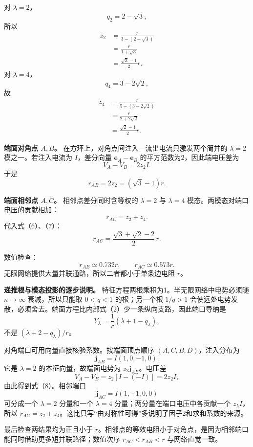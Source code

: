 \documentclass[12pt,a4paper,UTF8]{ctexart}
\begin{document}
对 \(\lambda=2\)， \[
q_2=2-\sqrt3,
\] 所以 \[
\begin{aligned}
z_2
&=\frac r{3-(2-\sqrt3)}\\
&=\frac r{1+\sqrt3}\\
&=\frac{\sqrt3-1}{2}r.
\end{aligned} \tag{6}
\] 对 \(\lambda=4\)， \[
q_4=3-2\sqrt2,
\] 故 \[
\begin{aligned}
z_4
&=\frac r{5-(3-2\sqrt2)}\\
&=\frac r{2+2\sqrt2}\\
&=\frac{\sqrt2-1}{2}r.
\end{aligned} \tag{7}
\]

\textbf{端面对角点 \(A,B\)。}
在方环上，对角点间注入---流出电流只激发两个简并的 \(\lambda=2\)
模之一。若注入电流为 \(I\)，差分向量 \(\boldsymbol e_A-\boldsymbol e_B\)
的平方范数为2，因此端电压差为 \[
V_A-V_B=2z_2I.
\] 于是 \[
\boxed{
r_{AB}=2z_2=(\sqrt3-1)r
}. \tag{8}
\]

\textbf{端面相邻点 \(A,C\)。} 相邻点差分同时含等权的 \(\lambda=2\) 与
\(\lambda=4\) 模态。两模态对端口电压的贡献相加： \[
r_{AC}=z_2+z_4.
\] 代入式（6）、（7）： \[
\boxed{
r_{AC}
=\frac{\sqrt3+\sqrt2-2}{2}\,r
}. \tag{9}
\]

数值检查： \[
r_{AB}\simeq0.732r,\qquad
r_{AC}\simeq0.573r.
\] 无限网络提供大量并联通路，所以二者都小于单条边电阻 \(r\)。

\textbf{递推根与模态投影的逐步说明。}
特征方程两根乘积为1。半无限网络中电势必须随 \(n\to\infty\)
衰减，所以只能取 \(0<q<1\) 的根；另一个根 \(1/q>1\)
会使远处电势发散，必须舍去。端面方程比内部式（2）少一条纵向支路，因此端口导纳是
\[
Y_\lambda=\frac1r(\lambda+1-q_\lambda),
\] 不是 \((\lambda+2-q_\lambda)/r\)。

对角端口可用向量直接核验系数。按端面顶点顺序 \((A,C,B,D)\)，注入分布为
\[
\boldsymbol j_{AB}=I(1,0,-1,0).
\] 它是 \(\lambda=2\) 的本征向量，故端面电势为
\(z_2\boldsymbol j_{AB}\)。电压差 \[
V_A-V_B=z_2[I-(-I)]=2z_2I,
\] 由此得到式（8）。相邻端口 \[
\boldsymbol j_{AC}=I(1,-1,0,0)
\] 可分成一个 \(\lambda=2\) 分量和一个 \(\lambda=4\)
分量；两分量在端口电压中各贡献一个 \(z_\lambda I\)，所以
\(r_{AC}=z_2+z_4\)。这比只写``由对称性可得''多说明了因子2和求和系数的来源。

最后检查两结果均为正且小于
\(r\)。相邻点的等效电阻小于对角点，是因为相邻端口能同时借助更多短并联路径；数值次序
\(r_{AC}<r_{AB}<r\) 与网络直觉一致。
\end{document}
